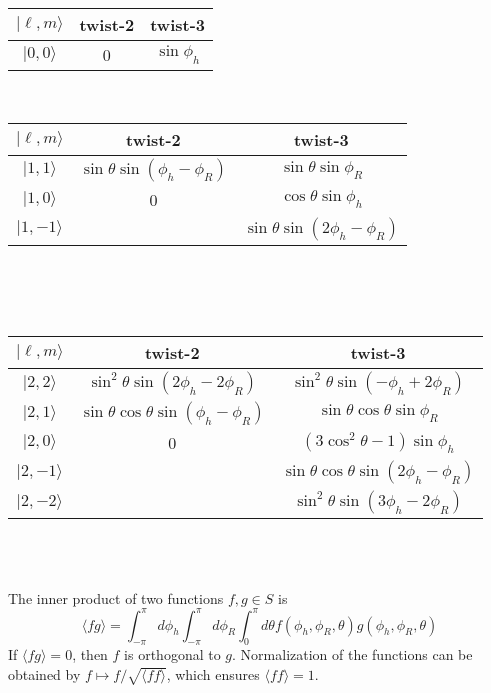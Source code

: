 \documentclass[12pt]{article}
\begin{document}
\begin{center}
\begin{tabular}{|c|c|c|}
\hline
$|\ell,m\rangle$ & twist-2 & twist-3 \\\hline\hline
$|0,0\rangle$ & 0 & $\sin\phi_h$ \\\hline
\end{tabular}
~ ~ ~
\begin{tabular}{|c|c|c|}
\hline
$|\ell,m\rangle$ & twist-2 & twist-3 \\\hline\hline
$|1,1\rangle$ & $\sin\theta\sin\left(\phi_h-\phi_R\right)$ & $\sin\theta\sin\phi_R$ \\\hline
$|1,0\rangle$ & 0 & $\cos\theta\sin\phi_h$ \\\hline
$|1,-1\rangle$ & $~$ & $\sin\theta\sin\left(2\phi_h-\phi_R\right)$ \\\hline
\end{tabular}
~\\~\\~\\
\begin{tabular}{|c|c|c|}
\hline
$|\ell,m\rangle$ & twist-2 & twist-3 \\\hline\hline
$|2,2\rangle$ & $\sin^2\theta\sin\left(2\phi_h-2\phi_R\right)$ & $\sin^2\theta\sin\left(-\phi_h+2\phi_R\right)$ \\\hline
$|2,1\rangle$ & $\sin\theta\cos\theta\sin\left(\phi_h-\phi_R\right)$ & $\sin\theta\cos\theta\sin\phi_R$ \\\hline
$|2,0\rangle$ & 0 & $\left(3\cos^2\theta-1\right)\sin\phi_h$ \\\hline
$|2,-1\rangle$ & $~$ & $\sin\theta\cos\theta\sin\left(2\phi_h-\phi_R\right)$ \\\hline
$|2,-2\rangle$ & $~$ & $\sin^2\theta\sin\left(3\phi_h-2\phi_R\right)$ \\\hline
\end{tabular}
~\\~\\
\end{center}
The inner product of two functions $f,g\in S$ is
\begin{equation}
\langle fg\rangle=
\int_{-\pi}^{\pi}d\phi_h
\int_{-\pi}^{\pi}d\phi_R
\int_{0}^{\pi}d\theta
f\left(\phi_h,\phi_R,\theta\right)
g\left(\phi_h,\phi_R,\theta\right)
\end{equation}
If $\langle fg\rangle=0$, then $f$ is orthogonal to $g$. Normalization of the
functions can be obtained by $f\mapsto f/\sqrt{\langle ff\rangle}$, which
ensures $\langle ff\rangle=1$.  
\end{document}
